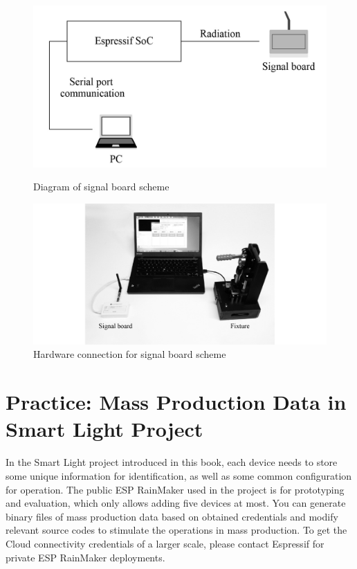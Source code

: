 \documentclass[a4paper,12pt,openany]{book}
\begin{document}
\begin{figure}[!h]
  \Centering
  \begin{minipage}[b]{0.45\textwidth}
    \includegraphics[width=\textwidth]{D14Z/14-4}
    \caption{\Centering Diagram of signal board scheme}
  \end{minipage}
  \begin{minipage}[b]{0.53\textwidth}
    \includegraphics[width=\textwidth]{D14Z/14-5}
    \caption{\Centering Hardware connection for signal board scheme}
  \end{minipage}
\end{figure}

\section{Practice: Mass Production Data in Smart Light Project}

In the Smart Light project introduced in this book, each device needs to store some unique information for identification, as well as some common configuration for operation. The public ESP RainMaker used in the project is for prototyping and evaluation, which only allows adding five devices at most. You can generate binary files of mass production data based on obtained credentials and modify relevant source codes to stimulate the operations in mass production. To get the Cloud connectivity credentials of a larger scale, please contact Espressif for private ESP RainMaker deployments.
\end{document}
